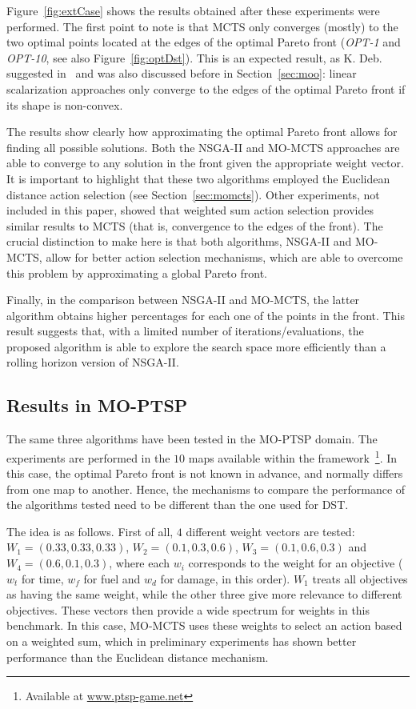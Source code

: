 \documentclass[journal]{IEEEtran}
\begin{document}
Figure~\ref{fig:extCase} shows the results obtained after these experiments were performed. The first point to note is that MCTS only converges (mostly) to the two optimal points located at the edges of the optimal Pareto front (\textit{OPT-1} and \textit{OPT-10}, see also Figure~\ref{fig:optDst}). This is an expected result, as K. Deb. suggested in~\cite{Deb2001} and was also discussed before in Section~\ref{sec:moo}: linear scalarization approaches only converge to the edges of the optimal Pareto front if its shape is non-convex.

The results show clearly how approximating the optimal Pareto front allows for finding all possible solutions. Both the NSGA-II and MO-MCTS approaches are able to converge to any solution in the front given the appropriate weight vector. It is important to highlight that these two algorithms employed the Euclidean distance action selection (see Section~\ref{sec:momcts}). Other experiments, not included in this paper, showed that weighted sum action selection provides similar results to MCTS (that is, convergence to the edges of the front). The crucial distinction to make here is that both algorithms, NSGA-II and MO-MCTS, allow for better action selection mechanisms, which are able to overcome this problem by approximating a global Pareto front.

Finally, in the comparison between NSGA-II and MO-MCTS, the latter algorithm obtains higher percentages for each one of the points in the front. This result suggests that, with a limited number of iterations/evaluations, the proposed algorithm is able to explore the search space more efficiently than a rolling horizon version of NSGA-II.


\subsection{Results in MO-PTSP} \label{ssec:resMOPTSP}

The same three algorithms have been tested in the MO-PTSP domain. The experiments are performed in the $10$ maps available within the framework~\footnote{Available at \url{www.ptsp-game.net}}. In this case, the optimal Pareto front is not known in advance, and normally differs from one map to another. Hence, the mechanisms to compare the performance of the algorithms tested need to be different than the one used for DST.

The idea is as follows. First of all, $4$ different weight vectors are tested: $W_1 = (0.33,0.33,0.33)$, $W_2 = (0.1,0.3,0.6)$, $W_3 = (0.1,0.6,0.3)$ and $W_4 = (0.6,0.1,0.3)$, where each $w_i$ corresponds to the weight for an objective ($w_t$ for time, $w_f$ for fuel and $w_d$ for damage, in this order). $W_1$ treats all objectives as having the same weight, while the other three give more relevance to different objectives. These vectors then provide a wide spectrum for weights in this benchmark. In this case, MO-MCTS uses these weights to select an action based on a weighted sum, which in preliminary experiments has shown better performance than the Euclidean distance mechanism.
\end{document}
